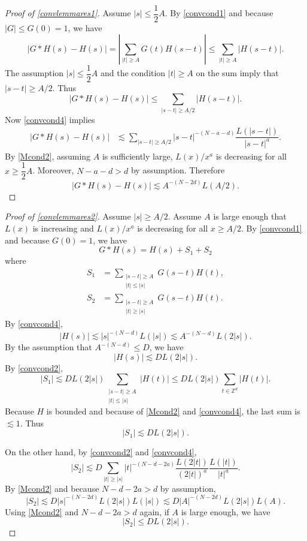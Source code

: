 \documentclass{amsart}
\numberwithin{equation}{section}
\theoremstyle{definition}
\theoremstyle{definition}
\def\ZZ{\mathbb{Z}}
\newcommand{\abs}[1]{\left| {#1} \right|}
\begin{document}
\begin{proof}[Proof of \eqref{convlemmares1}] 
Assume $|s| \leq \dfrac{1}{2} A$. 
By \eqref{convcond1} and because  
$|G| \leq G(0)=1$, 
we have 
$$
|G \ast H(s) - H(s)| 
= \abs{\sum_{|t| \geq A} G(t) H(s-t)}
\leq \sum_{|t| \geq A} |H(s-t)|. 
$$
The assumption $|s| \leq \dfrac{1}{2} A$ and the condition $|t| \geq A$ on the sum imply that 
$|s-t| \geq A/2$. 
Thus 
$$
|G \ast H(s) - H(s)| \leq \sum_{ |s-t| \geq A/2 } |H(s-t)|. 
$$
Now \eqref{convcond4} implies 
\begin{align*}
|G \ast H(s) - H(s)| 
&\lesssim 
\sum_{ |s-t| \geq A/2  }|s-t|^{-(N-a-d)} \dfrac{L(|s-t|)}{|s-t|^a}.  
\end{align*} 
By \eqref{Mcond2}, assuming $A$ is sufficiently large, 
$L(x)/x^a$ is decreasing for all $x \geq \dfrac{1}{2} A$. 
Moreover, $N - a - d > d$ by assumption. 
Therefore 
$$
|G \ast H(s) - H(s)| 
\lesssim 
A^{-(N-2d)} L(A/2). 
$$
%
\end{proof}



\begin{proof}[Proof of \eqref{convlemmares2}] 
Assume $|s| \geq A/2$. Assume $A$ is large enough that 
$L(x)$ is increasing 
and $L(x)/x^a$ is decreasing for all $x \geq A/2$. 
By \eqref{convcond1} and because $G(0)=1$, we have 
$$
G \ast H(s) = H(s) + S_1 + S_2 %
$$
where 
\begin{align*}
S_1 &= \sum_{\substack{|s-t| \geq A \\ |t| \leq |s|}} G(s-t) H(t), \\
S_2 &= \sum_{\substack{|s-t| \geq A \\ |t| \geq |s|}} G(s-t) H(t).
\end{align*}
%
By  \eqref{convcond4}, 
$$
|H(s)| \lesssim  |s|^{-(N-d)} L(|s|) \lesssim 
A^{-(N-d)} L(2|s|). 
$$
%
By the assumption that 
$A^{-(N-d)} \leq D$, we have 
$$|H(s)| \lesssim  DL(2|s|).$$
%
By \eqref{convcond2}, 
$$
|S_1| \lesssim 
D L(2|s|) \sum_{\substack{|s-t| \geq A \\ |t| \leq |s|}} |H(t)|
\leq 
D L(2|s|) \sum_{t \in \ZZ^d} |H(t)|.  
$$
Because $H$ is bounded and because of \eqref{Mcond2} and \eqref{convcond4}, 
the last sum is $\lesssim 1$. 
Thus 
$$
|S_1| \lesssim D L(2|s|). 
$$

On the other hand, by \eqref{convcond2} and \eqref{convcond4}, 
$$
|S_2| \lesssim 
D \sum_{|t| \geq |s|} |t|^{-(N-d-2a)} \dfrac{L(2|t|)}{(2|t|)^a} \dfrac{L(|t|)}{|t|^a}. 
$$
By \eqref{Mcond2} and because $N-d-2a>d$ by assumption, 
$$
|S_2| \lesssim 
D |s|^{-(N-2d)} L(2|s|) L(|s|)  
\lesssim 
D |A|^{-(N-2d)} L(2|s|) L(A). 
$$
%
Using \eqref{Mcond2} and $N-d-2a>d$ again, if $A$ is large enough, we have 
$$
|S_2| \leq DL(2|s|).
$$
\end{proof}
\end{document}
